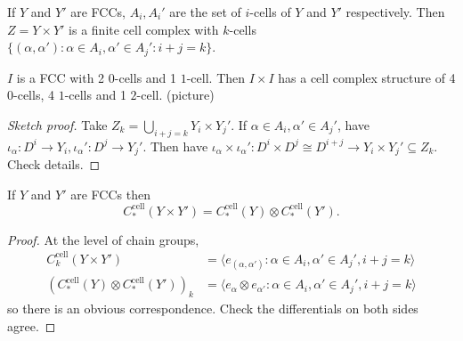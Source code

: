 \documentclass[a4paper]{article}
\newcommand{\cell}{\mathrm{cell}}
\begin{document}
\begin{proposition}
  If \(Y\) and \(Y'\) are FCCs, \(A_i, A_i'\) are the set of \(i\)-cells of \(Y\) and \(Y'\) respectively. Then \(Z = Y \times Y'\) is a finite cell complex with \(k\)-cells \(\{(\alpha, \alpha'): \alpha \in A_i, \alpha' \in A_j': i + j = k\}\).
\end{proposition}

\begin{eg}
  \(I\) is a FCC with 2 \(0\)-cells and 1 \(1\)-cell. Then \(I \times I\) has a cell complex structure of 4 \(0\)-cells, 4 \(1\)-cells and 1 \(2\)-cell. (picture)
\end{eg}

\begin{proof}[Sketch proof]
  Take \(Z_k = \bigcup_{i + j = k} Y_i \times Y_j'\). If \(\alpha \in A_i, \alpha' \in A_j'\), have \(\iota_\alpha: D^i \to Y_i, \iota_\alpha': D^j \to Y_j'\). Then have \(\iota_\alpha \times \iota_\alpha': D^i \times D^j \cong D^{i + j} \to Y_i \times Y_j' \subseteq Z_k\). Check details.
\end{proof}

\begin{theorem}
  If \(Y\) and \(Y'\) are FCCs then
  \[
    C_*^\cell(Y \times Y') = C_*^\cell(Y) \otimes C_*^\cell(Y').
  \]
\end{theorem}

\begin{proof}
  At the level of chain groups,
  \begin{align*}
    C_k^\cell(Y \times Y') &= \langle e_{(\alpha, \alpha')}: \alpha \in A_i, \alpha' \in A_j', i + j = k \rangle \\
    (C_*^\cell(Y) \otimes C_*^\cell(Y'))_k &= \langle e_\alpha \otimes e_{\alpha'}: \alpha \in A_i, \alpha' \in A_j', i + j = k \rangle
  \end{align*}
  so there is an obvious correspondence. Check the differentials on both sides agree.
\end{proof}
\end{document}
